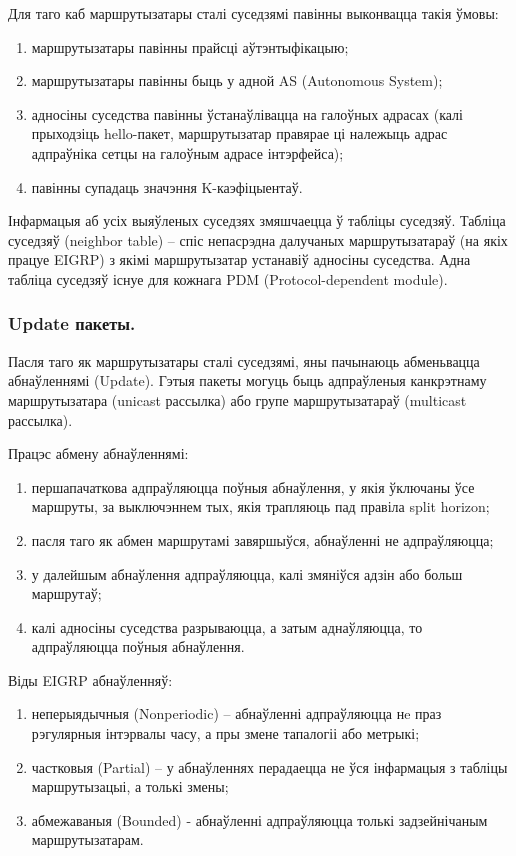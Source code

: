 Для таго каб маршрутызатары сталі суседзямі павінны выконвацца такія ўмовы:
\begin{enumerate}
    \item маршрутызатары павінны прайсці аўтэнтыфікацыю;
    \item маршрутызатары павінны быць у адной AS (Autonomous System);
    \item адносіны суседства павінны ўстанаўлівацца на галоўных адрасах (калі прыходзіць hello-пакет, маршрутызатар правярае ці належыць адрас адпраўніка сетцы на галоўным адрасе інтэрфейса);
    \item павінны супадаць значэння K-каэфіцыентаў.
\end{enumerate}

Інфармацыя аб усіх выяўленых суседзях змяшчаецца ў табліцы суседзяў.
Табліца суседзяў (neighbor table) -- спіс непасрэдна далучаных маршрутызатараў (на якіх працуе EIGRP) з якімі маршрутызатар устанавіў адносіны суседства. Адна табліца суседзяў існуе для кожнага PDM (Protocol-dependent module).

\subsubsection{Update пакеты.}

Пасля таго як маршрутызатары сталі суседзямі, яны пачынаюць абменьвацца абнаўленнямі (Update). Гэтыя пакеты могуць быць адпраўленыя канкрэтнаму маршрутызатара (unicast рассылка) або групе маршрутызатараў (multicast рассылка).

Працэс абмену абнаўленнямі:
\begin{enumerate}
    \item першапачаткова адпраўляюцца поўныя абнаўлення, у якія ўключаны ўсе маршруты, за выключэннем тых, якія трапляюць пад правіла split horizon;
    \item пасля таго як абмен маршрутамі завяршыўся, абнаўленні не адпраўляюцца;
    \item у далейшым абнаўлення адпраўляюцца, калі змяніўся адзін або больш маршрутаў;
    \item калі адносіны суседства разрываюцца, а затым аднаўляюцца, то адпраўляюцца поўныя абнаўлення.
\end{enumerate}

Віды EIGRP абнаўленняў:
\begin{enumerate}
    \item неперыядычныя (Nonperiodic) -- абнаўленні адпраўляюцца нe праз рэгулярныя інтэрвалы часу, а пры змене тапалогіі або метрыкі;
    \item частковыя (Partial) -- у абнаўленнях перадаецца не ўся інфармацыя з табліцы маршрутызацыі, а толькі змены;
    \item абмежаваныя (Bounded) - абнаўленні адпраўляюцца толькі задзейнічаным маршрутызатарам.
\end{enumerate}

